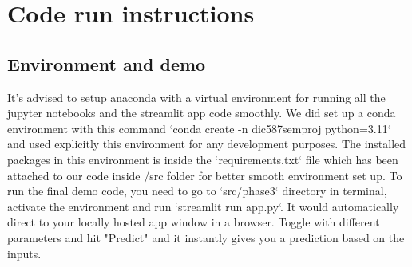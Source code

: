 \chapter{Code run instructions}


\section{Environment and demo}

It's advised to setup anaconda with a virtual environment for running all the jupyter notebooks and the streamlit app code smoothly. We did set up a conda environment with this command `conda create -n dic587semproj python=3.11` and used explicitly this environment for any development purposes. The installed packages in this environment is inside the `requirements.txt` file which has been attached to our code inside /src folder for better smooth environment set up. To run the final demo code, you need to go to `src/phase3` directory in terminal, activate the environment and run `streamlit run app.py`. It would automatically direct to your locally hosted app window in a browser. Toggle with different parameters and hit "Predict" and it instantly gives you a prediction based on the inputs.